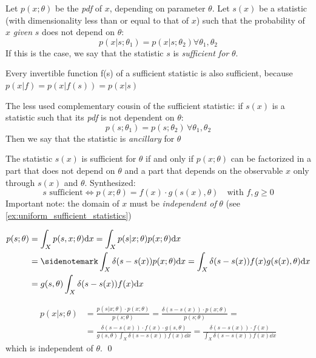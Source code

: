 \begin{definition}
	Let $p(x;\theta)$ be the \emph{pdf} of $x$, depending on parameter $\theta$. Let $s(x)$ be a statistic (with dimensionality less than or equal to that of $x$) such that the probability of $x$ \emph{given} $s$ does not depend on $\theta$:
	\[
	p(x|s;\theta_1) = p(x|s;\theta_2) \forall\theta_1,\theta_2
	\]
	If this is the case, we say that the statistic $s$ is \emph{sufficient for} $\theta$.
\end{definition}
\begin{corollary}
	Every invertible function f(s) of a sufficient statistic is also sufficient, because $p(x|f) = p(x | f(s)) = p(x|s)$\sidenotemark
\end{corollary}
\begin{definition}
	The less used complementary cousin of the sufficient statistic: if $s(x)$ is a statistic such that its \emph{pdf} is not dependent on $\theta$:
	\[
	p(s;\theta_1) = p(s;\theta_2) \, \forall \theta_1,\theta_2
	\]
	Then we say that the statistic is \emph{ancillary} for $\theta$
\end{definition}
\begin{theorem}
	The statistic $s(x)$ is sufficient for $\theta$ if and only if $p(x;\theta)$ can be factorized in a part that does not depend on $\theta$ and a part that depends on the observable $x$ only through $s(x)$ and $\theta$. Synthesized:
	\[
	s \text{ sufficient}\iff p(x;\theta) = f(x)\cdot g(s(x),\theta) \quad \text{with } f,g\geq0
	\]
	Important note: the domain of $x$ must be \emph{independent of} $\theta$ (see \ref{ex:uniform_sufficient_statistics})
\label{th:factorization}
\end{theorem}

\begin{example}
	\begin{align*}
	p(s;\theta) &= \int_X p(s,x;\theta)\dd x = \int_X p(s|x;\theta)p(x;\theta)\dd x \\
	&= \sidenotemark \int_X \delta(s-s(x))p(x;\theta) \dd x = \int_X \delta(s-s(x))f(x)g(s(x),\theta) \dd x \\
	&= g(s,\theta)\int_X \delta(s-s(x))f(x)\dd x
	\end{align*}
	 
	\begin{align*}
	p(x|s;\theta) &= \frac{p(s|x;\theta)\cdot p(x;\theta)}{p(s;\theta)} = \frac{\delta(s-s(x))\cdot p(x;\theta)}{p(s;\theta)} =\\
	&= \frac{\delta(s-s(x))\cdot f(x)\cdot g(s,\theta)}{g(s,\theta)\int_X \delta(s-s(x))f(x)\dd x} = \frac{\delta(s-s(x))\cdot f(x)}{\int_X\delta(s-s(x))f(x)\dd x}	
	\end{align*}
	which is independent of $\theta$. \qed	
\end{example}

